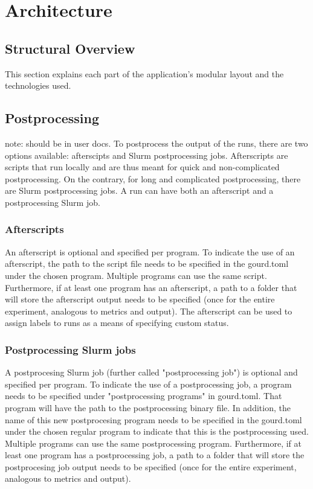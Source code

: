 \pagebreak


\section{Architecture}\label{sec:architecture}

\subsection{Structural Overview}

This section explains each part of the application's modular layout and the technologies used.


\subsection{Postprocessing}
note: should be in user docs.
To postprocess the output of the runs, there are two options available: afterscipts and Slurm postprocessing jobs. 
Afterscripts are scripts that run locally and are thus meant for quick and non-complicated 
postprocessing. On the contrary, for long and complicated postprocessing, there are Slurm postprocessing jobs.
A run can have both an afterscript and a postprocessing Slurm job.

\subsubsection{Afterscripts}
An afterscript is optional and specified per program. To indicate the use of an afterscript, the path to the script 
file needs to be specified in the gourd.toml under the chosen program. Multiple programs can use the same script.
Furthermore, if at least one program has an afterscript, a path to a folder that will store the afterscript output 
needs to be specified (once for the entire experiment, analogous to metrics and output). The afterscript can be used 
to assign labels to runs as a means of specifying custom status.

\subsubsection{Postprocessing Slurm jobs}
A postprocesing Slurm job (further called "postprocessing job") is optional and specified per program. To indicate 
the use of a postprocessing job, a program needs to be specified under "postprocessing programs" in gourd.toml. 
That program will have the path to the postprocessing binary file. In addition, the name of this new postprocesing 
program needs to be specified in the gourd.toml under the chosen regular program to indicate that this is the 
postprocessing used. Multiple programs can use the same postprocessing program. Furthermore, if at least one program 
has a postprocessing job, a path to a folder that will store the postprocesing job output needs to be specified 
(once for the entire experiment, analogous to metrics and output). 

